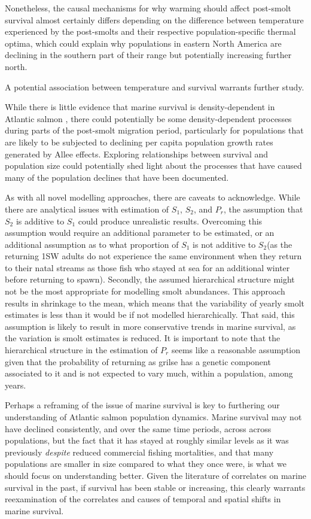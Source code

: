 \documentclass[12pt]{article}
\newcommand{\So}{$S_{1}$\xspace}
\newcommand{\St}{$S_{2}$\xspace}
\newcommand{\Pg}{$P_r$\xspace}
\begin{document}
Nonetheless, the causal mechanisms for why warming should affect post-smolt
survival almost certainly differs depending on the difference between
temperature experienced by the post-smolts and their respective
population-specific thermal optima, which could explain why populations in eastern North America are declining
in the southern part of their range but potentially increasing further north.

A potential association between temperature and survival warrants
further study.

While there is little evidence that marine survival is density-dependent in
Atlantic salmon \citep{Jonsson1998,Gibson2006}, there could potentially be
some density-dependent processes during parts of the post-smolt migration
period, particularly for populations that are likely to be subjected to
declining per capita population growth rates generated by Allee effects.
Exploring relationships between survival and population size could potentially
shed light about the processes that have caused many of the population
declines that have been documented.

As with all novel modelling approaches, there are caveats to acknowledge.
While there are analytical issues with estimation of \So, \St, and \Pg,
the assumption that \St is additive to \So could produce unrealistic results.
Overcoming this assumption would require an additional parameter to be
estimated, or an additional assumption as to what proportion of \So is not
additive to \St (as the returning 1SW adults do not experience the same
environment when they return to their natal streams as those fish who stayed
at sea for an additional winter before returning to spawn).
Secondly, the assumed hierarchical structure might not be the most appropriate
for modelling smolt abundances. This approach results in shrinkage to the
mean, which means that the variability of yearly smolt estimates is less than
it would be if not modelled hierarchically. 
That said, this assumption is likely to result in more conservative trends in marine survival, as the
variation is smolt estimates is reduced.
It is important to note that the hierarchical structure in the estimation of
\Pg seems like a reasonable assumption given that the probability of returning
as grilse has a genetic component associated to it \citep{Aykanat2019} and is
not expected to vary much, within a population, among years.

Perhaps a reframing of the issue of marine survival is key to furthering our
understanding of Atlantic salmon population dynamics. Marine
survival may not have declined consistently, and over the same time periods, across across populations, but the fact that it has stayed at
roughly similar levels as it was previously \emph{despite} reduced commercial fishing mortalities,
and that many populations are smaller in size compared to what they once were, is
what we should focus on understanding better.
Given the literature of correlates on marine survival in the past, if survival
has been stable or increasing, this clearly warrants reexamination of the
correlates and causes of temporal and spatial shifts in marine survival.
\end{document}
